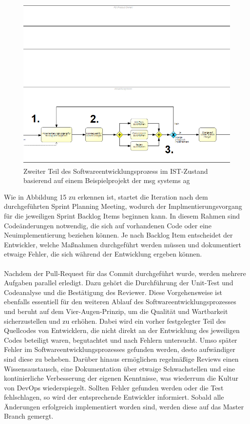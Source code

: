 \begin{figure}[h]
    \centering
    \includegraphics[scale=0.5]{Bilder/IST-Prozess_second Partv2.png}
    \caption{Zweiter Teil des Softwareentwicklungsprozess im IST-Zustand basierend auf einem Beispielprojekt der msg systems ag}
\end{figure}
\newpage
Wie in Abbildung 15 zu erkennen ist, startet die Iteration nach dem durchgeführten Sprint Planning Meeting, wodurch der Implmentierungsvorgang für die jeweiligen Sprint Backlog Items beginnen kann. In diesem Rahmen sind Codeänderungen notwendig, die sich auf vorhandenen Code oder eine Neuimplementierung beziehen können. Je nach Backlog Item entscheidet der Entwickler, welche Maßnahmen durchgeführt werden müssen und dokumentiert etwaige Fehler, die sich während der Entwicklung ergeben können.\\\\ Nachdem der Pull-Request für das Commit durchgeführt wurde, werden mehrere Aufgaben parallel erledigt. Dazu gehört die Durchführung der Unit-Test und Codeanalyse und die Bestätigung des Reviewer. Diese Vorgehensweise ist ebenfalls essentiell für den weiteren Ablauf des Softwareentwicklungsprozesses und beruht auf dem Vier-Augen-Prinzip, um die Qualität und Wartbarkeit sicherzustellen und zu erhöhen. Dabei wird ein vorher festgelegter Teil des Quellcodes von Entwicklern, die nicht direkt an der Entwicklung des jeweiligen Codes beteiligt waren, begutachtet und nach Fehlern untersucht. Umso später Fehler im Softwareentwicklungsprozesses gefunden werden, desto aufwändiger sind diese zu beheben. Darüber hinaus ermöglichen regelmäßige Reviews einen Wissensaustausch, eine Dokumentation über etwaige Schwachstellen und eine kontinierliche Verbesserung der eigenen Kenntnisse, was wiederrum die Kultur von DevOps wiederspiegelt. Sollten Fehler gefunden werden oder die Test fehlschlagen, so wird der entsprechende Entwickler informiert. Sobald alle Änderungen erfolgreich implementiert worden sind, werden diese auf das Master Branch gemergt. 


